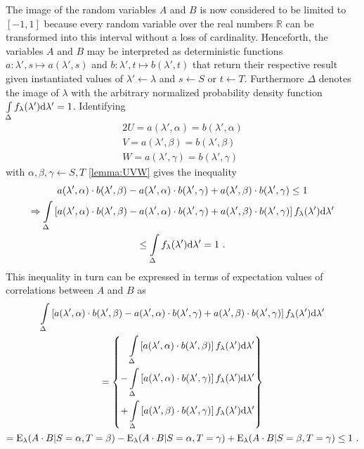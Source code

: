 The image of the random variables $A$ and $B$ is now considered to be limited to $[-1,1]$ because every random variable over the real numbers $\mathbb{R}$ can be transformed into this interval without a loss of cardinality.
Henceforth, the variables $A$ and $B$ may be interpreted as deterministic functions $a:\lambda',s\mapsto a(\lambda',s)$ and $b:\lambda',t\mapsto b(\lambda',t)$ that return their respective result given instantiated values of $\lambda'\leftarrow\lambda$ and $s\leftarrow S$ or $t\leftarrow T$.
Furthermore $\Delta$ denotes the image of $\lambda$ with the arbitrary normalized  probability density function $\int\limits_\Delta f_\lambda(\lambda')\mathrm{d}\lambda'
=1$.
Identifying
\begin{alignat*}{2}
U=a(\lambda',\alpha)=b(\lambda',\alpha)
\\
V=a(\lambda',\beta)=b(\lambda',\beta)
\\
W=a(\lambda',\gamma)=b(\lambda',\gamma)
\end{alignat*}
with $\alpha,\beta,\gamma\leftarrow S,T$ \cref{lemma:UVW} gives the inequality
\begin{multline}
a(\lambda',\alpha)\cdot b(\lambda',\beta)-a(\lambda',\alpha)\cdot b(\lambda',\gamma)+a(\lambda',\beta)\cdot b(\lambda',\gamma)
\leq1
\\
\Rightarrow
\int\limits_\Delta\left[a(\lambda',\alpha)\cdot b(\lambda',\beta)-a(\lambda',\alpha)\cdot b(\lambda',\gamma)+a(\lambda',\beta)\cdot b(\lambda',\gamma)\right]f_\lambda(\lambda')\mathrm{d}\lambda'
\\
\leq\int\limits_\Delta f_\lambda(\lambda')\mathrm{d}\lambda'
=1
\ .
\end{multline}
This inequality in turn can be expressed in terms of expectation values of correlations between $A$ and $B$ as
\begin{multline}
\label{eq:BellsInequality}
\int\limits_\Delta\left[a(\lambda',\alpha)\cdot b(\lambda',\beta)-a(\lambda',\alpha)\cdot b(\lambda',\gamma)+a(\lambda',\beta)\cdot b(\lambda',\gamma)\right]f_\lambda(\lambda')\mathrm{d}\lambda'
\\
=
\left\{
\begin{aligned}
\int\limits_\Delta\left[a(\lambda',\alpha)\cdot b(\lambda',\beta)\right]f_\lambda(\lambda')\mathrm{d}\lambda'
\\
-\int\limits_\Delta\left[a(\lambda',\alpha)\cdot b(\lambda',\gamma)\right]f_\lambda(\lambda')\mathrm{d}\lambda'
\\
+\int\limits_\Delta\left[a(\lambda',\beta)\cdot b(\lambda',\gamma)\right]f_\lambda(\lambda')\mathrm{d}\lambda'
\end{aligned}
\right\}
\\
=
\mathrm{E}_\lambda(A\cdot B|S=\alpha,T=\beta)
-\mathrm{E}_\lambda(A\cdot B|S=\alpha,T=\gamma)
+\mathrm{E}_\lambda(A\cdot B|S=\beta,T=\gamma)
\leq1
\ .
\end{multline}
